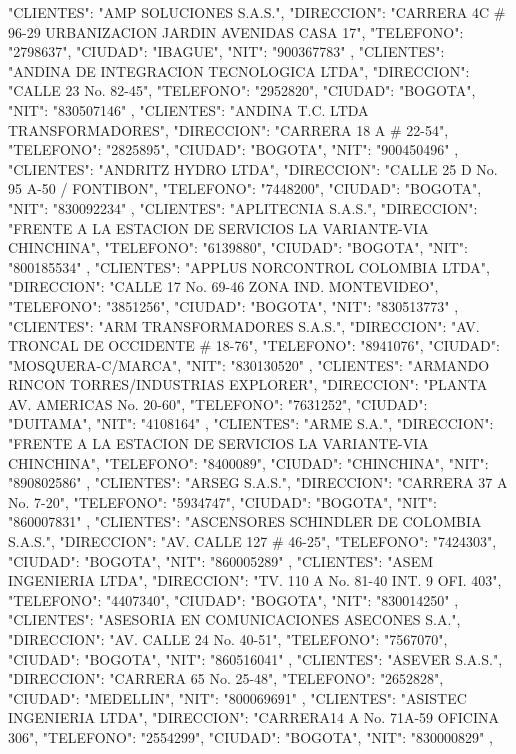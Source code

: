    {
   "CLIENTES": "AMP SOLUCIONES S.A.S.",
   "DIRECCION": "CARRERA 4C # 96-29 URBANIZACION JARDIN AVENIDAS CASA 17",
   "TELEFONO": "2798637",
   "CIUDAD": "IBAGUE",
   "NIT": "900367783"
   },
   {
   "CLIENTES": "ANDINA DE INTEGRACION TECNOLOGICA LTDA",
   "DIRECCION": "CALLE 23 No. 82-45",
   "TELEFONO": "2952820",
   "CIUDAD": "BOGOTA",
   "NIT": "830507146"
   },
   {
   "CLIENTES": "ANDINA T.C. LTDA TRANSFORMADORES",
   "DIRECCION": "CARRERA 18 A # 22-54",
   "TELEFONO": "2825895",
   "CIUDAD": "BOGOTA",
   "NIT": "900450496"
   },
   {
   "CLIENTES": "ANDRITZ HYDRO LTDA",
   "DIRECCION": "CALLE 25 D No. 95 A-50 / FONTIBON",
   "TELEFONO": "7448200",
   "CIUDAD": "BOGOTA",
   "NIT": "830092234"
   },
   {
   "CLIENTES": "APLITECNIA S.A.S.",
   "DIRECCION": "FRENTE A LA ESTACION DE SERVICIOS LA VARIANTE-VIA CHINCHINA",
   "TELEFONO": "6139880",
   "CIUDAD": "BOGOTA",
   "NIT": "800185534"
   },
   {
   "CLIENTES": "APPLUS NORCONTROL COLOMBIA LTDA",
   "DIRECCION": "CALLE 17 No. 69-46 ZONA IND. MONTEVIDEO",
   "TELEFONO": "3851256",
   "CIUDAD": "BOGOTA",
   "NIT": "830513773"
   },
   {
   "CLIENTES": "ARM TRANSFORMADORES S.A.S.",
   "DIRECCION": "AV. TRONCAL DE OCCIDENTE # 18-76",
   "TELEFONO": "8941076",
   "CIUDAD": "MOSQUERA-C/MARCA",
   "NIT": "830130520"
   },
   {
   "CLIENTES": "ARMANDO RINCON TORRES/INDUSTRIAS EXPLORER",
   "DIRECCION": "PLANTA AV. AMERICAS No. 20-60",
   "TELEFONO": "7631252",
   "CIUDAD": "DUITAMA",
   "NIT": "4108164"
   },
   {
   "CLIENTES": "ARME S.A.",
   "DIRECCION": "FRENTE A LA ESTACION DE SERVICIOS LA VARIANTE-VIA CHINCHINA",
   "TELEFONO": "8400089",
   "CIUDAD": "CHINCHINA",
   "NIT": "890802586"
   },
   {
   "CLIENTES": "ARSEG S.A.S.",
   "DIRECCION": "CARRERA 37 A No. 7-20",
   "TELEFONO": "5934747",
   "CIUDAD": "BOGOTA",
   "NIT": "860007831"
   },
   {
   "CLIENTES": "ASCENSORES SCHINDLER DE COLOMBIA S.A.S.",
   "DIRECCION": "AV. CALLE 127 # 46-25",
   "TELEFONO": "7424303",
   "CIUDAD": "BOGOTA",
   "NIT": "860005289"
   },
   {
   "CLIENTES": "ASEM INGENIERIA LTDA",
   "DIRECCION": "TV. 110 A No. 81-40 INT. 9 OFI. 403",
   "TELEFONO": "4407340",
   "CIUDAD": "BOGOTA",
   "NIT": "830014250"
   },
   {
   "CLIENTES": "ASESORIA EN COMUNICACIONES ASECONES S.A.",
   "DIRECCION": "AV. CALLE 24 No. 40-51",
   "TELEFONO": "7567070",
   "CIUDAD": "BOGOTA",
   "NIT": "860516041"
   },
   {
   "CLIENTES": "ASEVER S.A.S.",
   "DIRECCION": "CARRERA 65 No. 25-48",
   "TELEFONO": "2652828",
   "CIUDAD": "MEDELLIN",
   "NIT": "800069691"
   },
   {
   "CLIENTES": "ASISTEC INGENIERIA LTDA",
   "DIRECCION": "CARRERA14 A No. 71A-59 OFICINA 306",
   "TELEFONO": "2554299",
   "CIUDAD": "BOGOTA",
   "NIT": "830000829"
   },
